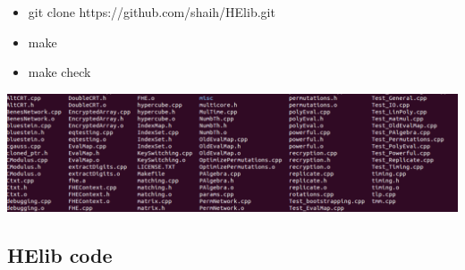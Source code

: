 \documentclass{article}
\begin{document}
\begin{itemize}
\begin{itemize}
\item git clone https://github.com/shaih/HElib.git
\item make
\item make check
\end{itemize}
\centerline{\includegraphics[width=1\textwidth]{HElib.png}}
\end{itemize}
 
 \subsection{HElib code}
 
\end{document}
